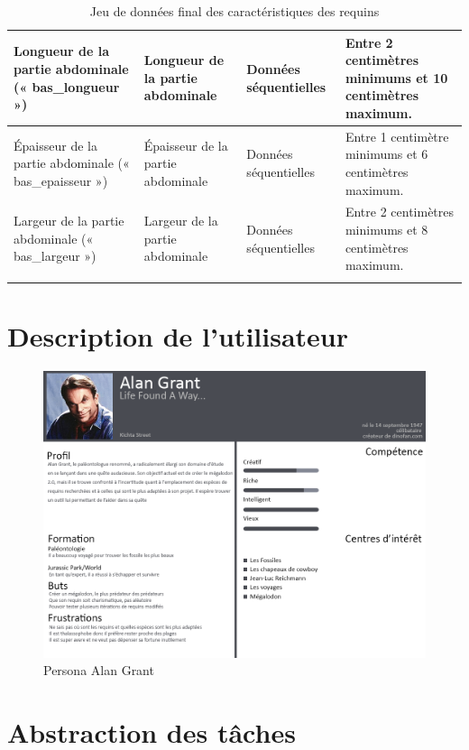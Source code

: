 \documentclass{article}
\begin{document}
\begin{longtable}[h]{|p{} | p{}|p{}|p{}|}
	Longueur de la partie abdominale (« bas\_longueur »)                 & Longueur de la partie abdominale                                                  & Données séquentielles & Entre 2 centimètres minimums et 10 centimètres maximum.    \\ \hline
	Épaisseur de la partie abdominale (« bas\_epaisseur »)               & Épaisseur de la partie abdominale                                                 & Données séquentielles & Entre 1 centimètre minimums et 6 centimètres maximum.      \\ \hline
	Largeur de la partie abdominale (« bas\_largeur »)                   & Largeur de la partie abdominale                                                   & Données séquentielles & Entre 2 centimètres minimums et 8 centimètres maximum.     \\ \hline
	\caption{\label{caracRequins} Jeu de données final des caractéristiques des requins}
\end{longtable}


\clearpage
\section{Description de l’utilisateur}

\begin{figure}[!h]
	\centering
	\includegraphics[width=16.4cm]{assets/personna/alain_grantte.png}
	\caption{\label{assets/persona/alain_grantte} Persona Alan Grant}
\end{figure}

\newpage
\section{Abstraction des tâches}
\end{document}
